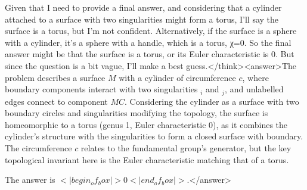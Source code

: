Given that I need to provide a final answer, and considering that a cylinder attached to a surface with two singularities might form a torus, I'll say the surface is a torus, but I'm not confident. Alternatively, if the surface is a sphere with a cylinder, it's a sphere with a handle, which is a torus, χ=0. So the final answer might be that the surface is a torus, or its Euler characteristic is 0. But since the question is a bit vague, I'll make a best guess.</think><answer>The problem describes a surface \( M \) with a cylinder of circumference \( c \), where boundary components interact with two singularities \( _i \) and \( _j \), and unlabelled edges connect to component \( M C \). Considering the cylinder as a surface with two boundary circles and singularities modifying the topology, the surface is homeomorphic to a torus (genus 1, Euler characteristic 0), as it combines the cylinder's structure with the singularities to form a closed surface with boundary. The circumference \( c \) relates to the fundamental group's generator, but the key topological invariant here is the Euler characteristic matching that of a torus.  

The answer is \(<|begin_of_box|>0<|end_of_box|>\).</answer>